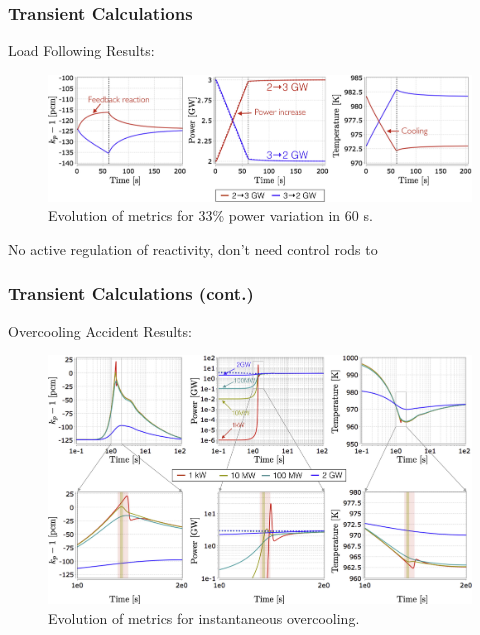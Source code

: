 \begin{frame}
  \frametitle{Transient Calculations}
  Load Following Results:
  \begin{figure}[htbp!]
        \begin{center}
        \includegraphics[scale=0.65]{JC-Oct16/transient-effects.jpg}
        \end{center}
        \caption{Evolution of metrics for 33\% power variation in 60 s.}
        \label{fig:transient}
  \end{figure}
        No active regulation of reactivity, don't need control rods to 


\end{frame}

\begin{frame}
\frametitle{Transient Calculations (cont.)}
        Overcooling Accident Results:
        \begin{figure}[htbp!]
                \begin{center}
                \includegraphics[scale=0.5]{JC-Oct16/overcooling-effects.jpg}
                \end{center}
                \caption{Evolution of metrics for instantaneous overcooling.}
                \label{fig:overcooling}
        \end{figure}


\end{frame}

